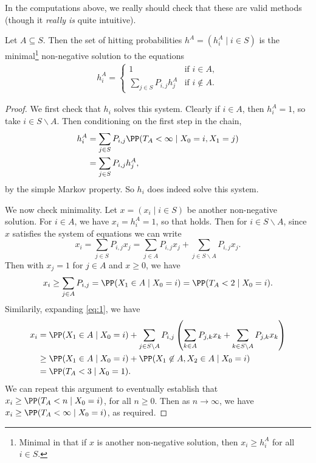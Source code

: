 \documentclass[a4paper]{scrartcl}
\begin{document}
In the computations above, we really should check that these are valid methods (though it \emph{really is} quite intuitive).

\begin{theorem}
	Let $A \subseteq S$. Then the set of hitting probabilities $h^A = (h_i^A \mid i \in S)$ is the minimal\footnote{Minimal in that if $x$ is another non-negative solution, then $x_i \geq h_i^A$ for all $i \in S$.} non-negative solution to the equations
	\begin{align*}
		h_i^A = \begin{cases}
			1 &\mbox{if } i  \in A, \\
			\sum_{j \in S} P_{i, j} h_j^A &\mbox{if } i \not \in A.
		   \end{cases}
	\end{align*}
\end{theorem}
\begin{proof}
	We first check that $h_i$ solves this system. Clearly if $i \in A$, then $h_i^A = 1$, so take $i \in S\backslash A$. Then conditioning on the first step in the chain,
	\begin{align*}
		h_i^A &= \sum_{j \in S} P_{i, j} \PP(T_A < \infty \mid X_0 = i, X_1 = j)  \\
		&= \sum_{j \in S} P_{i, j} h_j^A,
	\end{align*}
	by the simple Markov property. So $h_i$ does indeed solve this system.

	We now check minimality. Let $x = (x_i \mid i \in S)$ be another non-negative solution. For $i \in A$, we have $x_i = h^A_i = 1$, so that holds. Then for $i \in S \backslash A$, since $x$ satisfies the system of equations we can write
	\begin{equation}\label{eq:1}
		x_i = \sum_{j \in S}P_{i, j} x_j = \sum_{j \in A} P_{i, j} x_j + \sum_{j \in S \backslash A} P_{i, j} x_j. \tag{$\dagger$}
	\end{equation}
	Then with $x_j = 1$ for $j \in A$ and $x \geq 0$, we have
	\begin{align*}
		x_i \geq \sum_{j \in A} P_{i, j} = \PP(X_1 \in A \mid X_0 = i) = \PP(T_A < 2 \mid X_0 = i).
	\end{align*}
	Similarily, expanding \eqref{eq:1}, we have
	\begin{align*}
	x_i &= \PP(X_1 \in A \mid X_0 = i) + \sum_{j \in S \backslash A} P_{i, j} \left(\sum_{k \in A} P_{j, k} x_k + \sum_{k \in S \backslash A} P_{j, k} x_k\right) \\
		&\geq \PP(X_1 \in A \mid X_0 = i) + \PP(X_1 \not \in A, X_2 \in A \mid X_0 = i) \\
		&= \PP(T_A < 3 \mid X_0 = 1).
	\end{align*}
	We can repeat this argument to eventually establish that $x_i \geq \PP(T_A < n \mid X_0 = i)$, for all $n \geq 0$. Then as $n \rightarrow \infty$, we have $x_i \geq \PP(T_A < \infty \mid X_0 = i)$, as required.
\end{proof}
\end{document}
